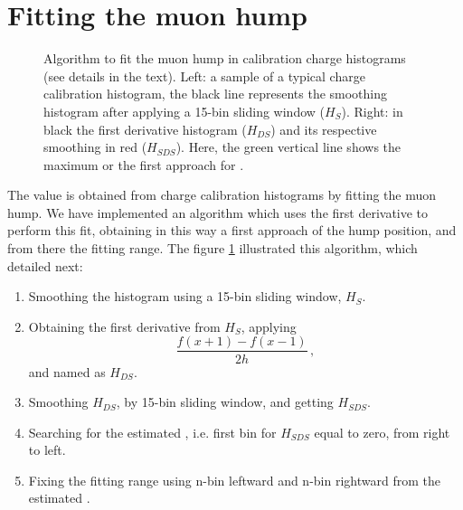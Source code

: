 \documentclass[twoside, final, 10pt]{articleMine}
\begin{document}
\section{Fitting the muon hump}
\label{secFitting}

\begin{figure}[!t]
  \label{figChargeDerivative}
  \centering
  \caption{Algorithm to fit the muon hump in calibration charge
  histograms (see details in the text). Left: a sample of a
  typical charge calibration histogram, the black line represents
  the smoothing histogram after applying a 15-bin sliding window
  ($H_S$). Right: in black the first derivative histogram
  ($H_{DS}$) and its respective smoothing in red ($H_{SDS}$).
  Here, the green vertical line shows the maximum or the first
  approach for \qpkvem.}
  \label{figChargeDerivative}
\end{figure}

The \qpkvem value is obtained from charge calibration histograms
by fitting the muon hump. We have implemented an algorithm which
uses the first derivative to perform this fit, obtaining in this
way a first approach of the hump position, and from there the
fitting range. The figure \ref{figChargeDerivative} illustrated
this algorithm, which detailed next:
\begin{enumerate}
  \item Smoothing the histogram using a 15-bin sliding window,
    $H_S$.
  \item Obtaining the first derivative from $H_S$, applying
    \begin{equation}
      \frac{f(x+1)-f(x-1)}{2h} \, ,
    \end{equation}
    and named as $H_{DS}$.
  \item Smoothing $H_{DS}$, by 15-bin sliding window, and
    getting $H_{SDS}$.
  \item Searching for the estimated \qpkvem, i.e. first bin for
    $H_{SDS}$ equal to zero, from right to left.
  \item Fixing the fitting range using n-bin leftward and n-bin
    rightward from the estimated \qpkvem.
\end{enumerate}
\clearpage 
\end{document}
